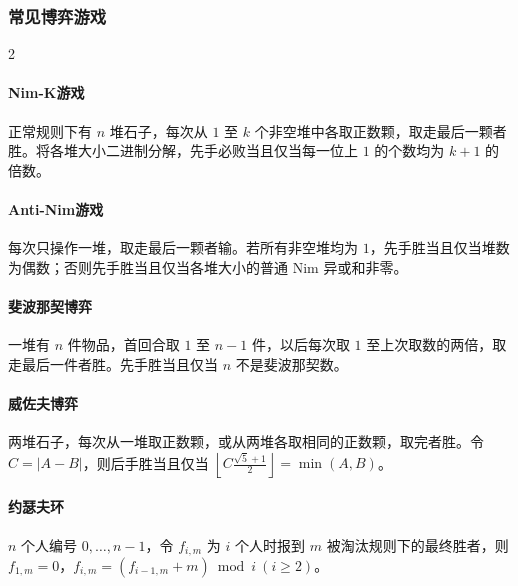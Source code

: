 \begin{footnotesize}
\subsubsection{常见博弈游戏}
\begin{multicols}{2}
\paragraph{Nim-K游戏}正常规则下有 $n$ 堆石子，每次从 $1$ 至 $k$ 个非空堆中各取正数颗，取走最后一颗者胜。将各堆大小二进制分解，先手必败当且仅当每一位上 $1$ 的个数均为 $k+1$ 的倍数。
\paragraph{Anti-Nim游戏}每次只操作一堆，取走最后一颗者输。若所有非空堆均为 $1$，先手胜当且仅当堆数为偶数；否则先手胜当且仅当各堆大小的普通 Nim 异或和非零。
\paragraph{斐波那契博弈}一堆有 $n$ 件物品，首回合取 $1$ 至 $n-1$ 件，以后每次取 $1$ 至上次取数的两倍，取走最后一件者胜。先手胜当且仅当 $n$ 不是斐波那契数。
\paragraph{威佐夫博弈}两堆石子，每次从一堆取正数颗，或从两堆各取相同的正数颗，取完者胜。令 $C=|A-B|$，则后手胜当且仅当 $\left\lfloor C\frac{\sqrt5+1}{2}\right\rfloor=\min(A,B)$。
\paragraph{约瑟夫环}$n$ 个人编号 $0,\dots,n-1$，令 $f_{i,m}$ 为 $i$ 个人时报到 $m$ 被淘汰规则下的最终胜者，则 $f_{1,m}=0$，$f_{i,m}=(f_{i-1,m}+m)\bmod i\ (i\ge2)$。

\end{multicols}
\end{footnotesize}
